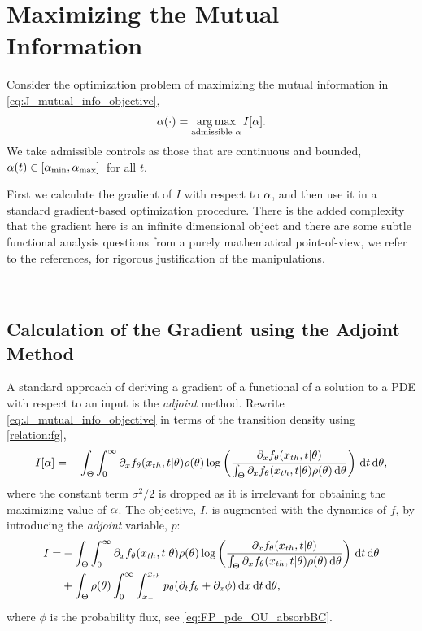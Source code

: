 \documentclass{article}
\begin{document}
\

\section{Maximizing the Mutual Information}
\label{sec:maximizing_MI}
Consider the optimization problem of maximizing the mutual information
in \cref{eq:J_mutual_info_objective}, 
$$
\a(\cdot) = \argmax_{ \textrm{admissible  } \a} I[\a].
$$ 
We take admissible controls as those that are continuous and bounded, ${\alpha}(t) \in [{ {\alpha}_{\textrm{min}} }, { {\alpha}_{\textrm{max}} }] \,$  for all $t$.

First we calculate the gradient of $I$ with respect to ${\alpha}$, and then
use it in a standard gradient-based optimization procedure. There is the added
complexity that the gradient here is an infinite dimensional object and there
are some subtle functional analysis questions from a purely mathematical
point-of-view, we refer to the references, \cite{Lenhart2007,Borzi2012} for
rigorous justification of the manipulations. 

\

\subsection{Calculation of the Gradient using the Adjoint Method}

A standard approach of deriving a gradient of a
functional of a solution to a PDE with respect to an input is the {\sl
  adjoint}  method. Rewrite
\cref{eq:J_mutual_info_objective} in terms of the transition density using \cref{relation:fg},
\begin{equation}
I[{\alpha}] = 
- \int_\Theta \int_0^\infty
	   {\partial}_xf_{\theta}({ x_{th} }, t|{\theta})  \rho({\theta}) 
		\log \left( \frac{{\partial}_xf_{\theta}({ x_{th} }, t|{\theta})}
						{\int_\Theta {\partial}_xf_{\theta}({ x_{th} }, t|{\theta})\rho({\theta})
\, \mathrm{d} {\theta} } \right)
\, \mathrm{d} t\, \mathrm{d} {\theta},
\label{eq:I_mutual_info_objective_in_terms_of_dixf} 
\end{equation}
where the constant term $\sigma^2/2$ is dropped as it is irrelevant for
obtaining the maximizing value of ${\alpha}$.
The objective, $I$, is augmented with the dynamics of $f$, by introducing the {\sl
adjoint} variable, $p$: 
\begin{align}
I=&  -
\int_\Theta \int_0^\infty 
	  {\partial}_xf_{\theta}({ x_{th} }, t|{\theta})  \rho({\theta}) 
		\log \left( \frac{{\partial}_xf_{\theta}({ x_{th} }, t|{\theta})}
						{\int_\Theta {\partial}_xf_{\theta}({ x_{th} }, t|{\theta})\rho({\theta})\, \mathrm{d} {\theta} } \right)
\, \mathrm{d} t\, \mathrm{d} {\theta} 
\\
	  &+ \int_\Theta  \rho({\theta})  \int_0^\infty \int_{x_-}^{{ x_{th} }}
	  		p_{\theta}  ({\partial}_t f_{\theta} + {\partial}_x \phi) 
  				\, \mathrm{d} x	  \, \mathrm{d} t \, \mathrm{d} {\theta},
	  \label{eq:adjoint_term_in_objective} 
\end{align}
where $\phi$ is the probability flux, see \cref{eq:FP_pde_OU_absorbBC}.
\end{document}
